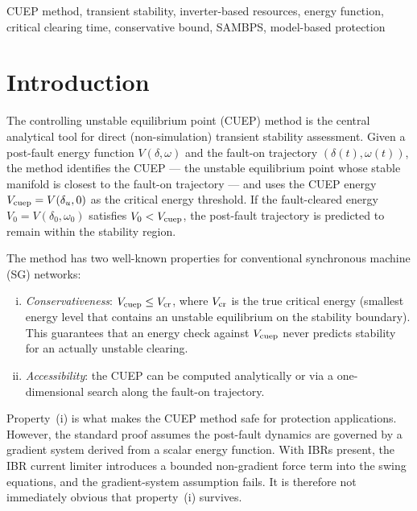 \documentclass[journal]{IEEEtran}
\newcommand{\Vcuep}{V_{\rm cuep}}
\newcommand{\Vcr}{V_{\rm cr}}
\newcommand{\Vnaught}{V_0}
\newcommand{\deltau}{\delta_u}
\begin{document}
\begin{IEEEkeywords}
CUEP method, transient stability, inverter-based resources,
energy function, critical clearing time, conservative bound,
SAMBPS, model-based protection
\end{IEEEkeywords}

\section{Introduction}
\label{sec:intro}

The controlling unstable equilibrium point (CUEP) method
\cite{Chiang1989CUEP,Kundur1994,Pai1989energy} is the central
analytical tool for direct (non-simulation) transient stability
assessment.  Given a post-fault energy function $V(\delta, \omega)$
and the fault-on trajectory $(\delta(t), \omega(t))$, the method
identifies the CUEP --- the unstable equilibrium point whose stable
manifold is closest to the fault-on trajectory --- and uses the
CUEP energy $\Vcuep = V(\deltau, 0)$ as the critical energy
threshold.  If the fault-cleared energy $\Vnaught = V(\delta_0, \omega_0)$
satisfies $\Vnaught < \Vcuep$, the post-fault trajectory is predicted
to remain within the stability region.

The method has two well-known properties for conventional synchronous
machine (SG) networks:
\begin{enumerate}[(i)]
  \item \emph{Conservativeness}: $\Vcuep \leq \Vcr$, where $\Vcr$
        is the true critical energy (smallest energy level that contains
        an unstable equilibrium on the stability boundary).
        This guarantees that an energy check against $\Vcuep$ never
        predicts stability for an actually unstable clearing.
  \item \emph{Accessibility}: the CUEP can be computed analytically
        or via a one-dimensional search along the fault-on trajectory.
\end{enumerate}

Property~(i) is what makes the CUEP method safe for protection
applications.  However, the standard proof \cite{Chiang1989CUEP}
assumes the post-fault dynamics are governed by a gradient system
derived from a scalar energy function.  With IBRs present, the IBR
current limiter introduces a bounded non-gradient force term into
the swing equations, and the gradient-system assumption fails.
It is therefore not immediately obvious that property~(i) survives.
\end{document}
